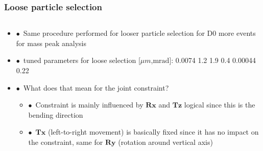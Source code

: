 \documentclass[aspectratio=1610, 12pt, xcolor=dvipsnames]{beamer}
\begin{document}
\begin{frame}\frametitle{Loose particle selection}
  \begin{columns}
    \begin{column}[c]{0.48\textwidth}
      \begin{itemize}
        \setlength\itemsep{0em}
        \item $\bullet$\, Same procedure performed for looser particle selection for D0 \to more events for mass peak analysis
        \item $\bullet$\, tuned parameters for loose selection [$\mu m$,$\text{mrad}$]: 0.0074 1.2 1.9 0.4 0.00044 0.22
        \item $\bullet$\, What does that mean for the joint constraint?
        \begin{itemize}
          \item $\bullet$\, Constraint is mainly influenced by $\textbf{Rx}$ and $\textbf{Tz}$ \to logical since this is the bending direction
          \item $\bullet$\, $\textbf{Tx}$ (left-to-right movement) is basically fixed since it has no impact on the constraint, same for $\textbf{Ry}$ (rotation around vertical axis)
        \end{itemize}
      \end{itemize}
    \end{column}
  \end{columns}
\end{frame}

\end{document}
